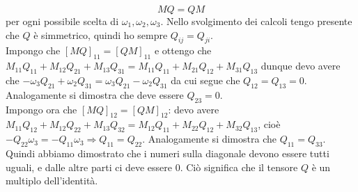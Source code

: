 \documentclass[../main.tex]{subfiles}
\begin{document}
\begin{equation}
 MQ=QM
\end{equation}
per ogni possibile scelta di $\omega_1, \omega_2, \omega_3$. Nello svolgimento dei calcoli tengo presente che $Q$ è simmetrico, quindi ho sempre $Q_{ij}=Q_{ji}$.\\
Impongo che $[MQ]_{11} = [QM]_{11}$ e ottengo che $M_{11}Q_{11}+M_{12}Q_{21}+M_{13}Q_{31} = M_{11}Q_{11}+M_{21}Q_{12}+M_{31}Q_{13}$ dunque devo avere che
$-\omega_3Q_{21}+\omega_2Q_{31} = \omega_3Q_{21}-\omega_2Q_{31}$ da cui segue che $Q_{12}=Q_{13} = 0$. Analogamente si dimostra che deve essere $Q_{23}=0$.\\
Impongo ora che $[MQ]_{12} = [QM]_{12}$: devo avere $M_{11}Q_{12}+M_{12}Q_{22}+M_{13}Q_{32} = M_{12}Q_{11}+M_{22}Q_{12}+M_{32}Q_{13}$, cioè
$ -Q_{22}\omega_3 = -Q_{11}\omega_3 \Rightarrow Q_{11}=Q_{22}$. Analogamente si dimostra che $Q_{11}=Q_{33}$.\\
Quindi abbiamo dimostrato che i numeri sulla diagonale devono essere tutti uguali, e dalle altre parti ci deve essere 0. Ciò significa che il tensore $Q$ è un multiplo dell'identità.
\end{document}
